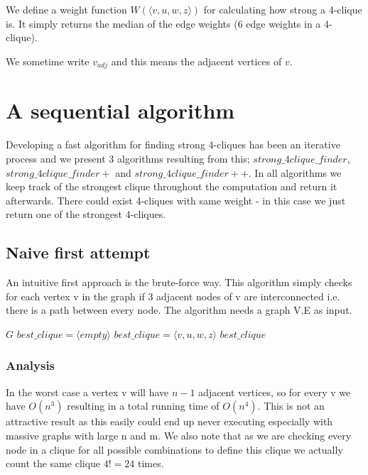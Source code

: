\documentclass{article}
\begin{document}
We define a weight function $W(\langle v,u,w,z\rangle )$ for calculating how strong a 4-clique is. It simply returns the median of the edge weights (6 edge weights in a 4-clique).

We sometime write $v_{adj}$ and this means the adjacent vertices of $v$.



\section{A sequential algorithm}
Developing a fast algorithm for finding strong 4-cliques has been an iterative process and we present 3 algorithms resulting from this; $strong\_4clique\_finder$, $strong\_4clique\_finder+$ and $strong\_4clique\_finder++$. In all algorithms we keep track of the strongest clique throughout the computation and return it afterwards. There could exist 4-cliques with same weight - in this case we just return one of the strongest 4-cliques.

\subsection{Naive first attempt}
An intuitive first approach is the brute-force way. This algorithm simply checks for each vertex v in the graph if 3 adjacent nodes of v are interconnected i.e. there is a path between every node. The algorithm needs a graph V,E as input.

\begin{algorithm}
\caption{$strong\_4clique\_finder$}
\begin{algorithmic}
\REQUIRE $G$
\STATE $best\_clique = \langle empty\rangle $
							\STATE $best\_clique = \langle v,u,w,z\rangle $
						\ENDIF
					\ENDIF
				\ENDFOR
			\ENDIF
		\ENDFOR
	\ENDFOR
\ENDFOR
\RETURN $best\_clique$
\end{algorithmic}
\end{algorithm}

\subsubsection{Analysis}
In the worst case a vertex v will have $n-1$ adjacent vertices, so for every v we have $O(n^{3})$ resulting in a total running time of $O(n^{4})$. This is not an attractive result as this easily could end up never executing especially with massive graphs with large n and m. We also note that as we are checking every node in a clique for all possible combinations to define this clique we actually count the same clique $4! = 24$ times.
\end{document}
